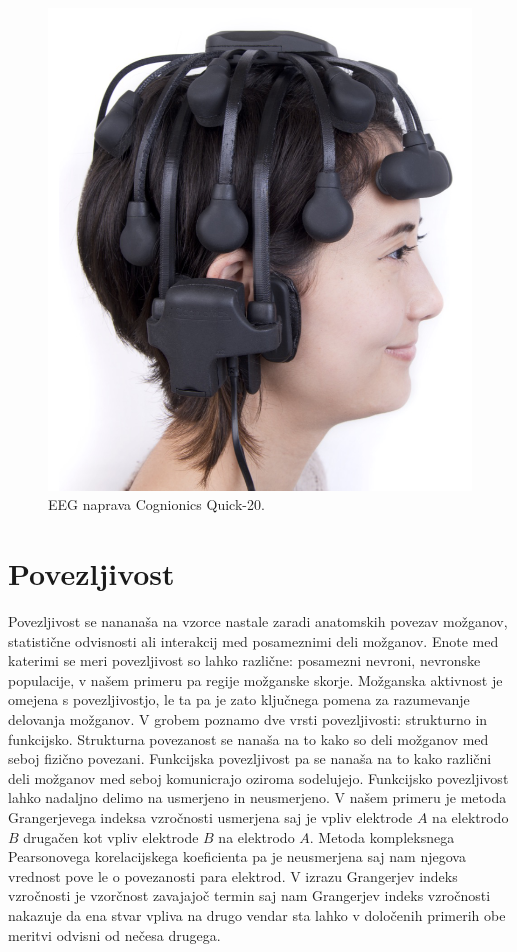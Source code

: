 \begin{figure}[h!]
    \begin{center}
    \includegraphics[width=0.5\linewidth]{slike/Cognionics Quick-20.png}
    \end{center}
    \caption{EEG naprava Cognionics Quick-20. \cite{CognionicsQUICK20User}}
    \label{slika:quick_20}
    \end{figure}
\section{Povezljivost}
Povezljivost se nananaša na vzorce nastale zaradi anatomskih povezav možganov, statistične odvisnosti ali interakcij med posameznimi deli možganov.  Enote med katerimi se meri povezljivost so lahko različne: posamezni nevroni, nevronske populacije, v našem primeru pa regije možganske skorje. Možganska aktivnost je omejena s povezljivostjo, le ta pa je zato ključnega pomena za razumevanje delovanja možganov. V grobem poznamo dve vrsti povezljivosti: strukturno in funkcijsko. Strukturna povezanost se nanaša na to kako so deli možganov med seboj fizično povezani. Funkcijska povezljivost pa se nanaša na to kako različni deli možganov med seboj komunicrajo oziroma sodelujejo.\cite{spornsBrainConnectivity2007} Funkcijsko povezljivost lahko nadaljno delimo na usmerjeno in neusmerjeno. V našem primeru je metoda Grangerjevega indeksa vzročnosti usmerjena saj je vpliv elektrode $A$ na elektrodo $B$ drugačen kot vpliv elektrode $B$ na elektrodo $A$. Metoda kompleksnega Pearsonovega korelacijskega koeficienta pa je neusmerjena saj nam njegova vrednost pove le o povezanosti para elektrod.
V izrazu Grangerjev indeks vzročnosti je vzorčnost zavajajoč termin saj nam Grangerjev indeks vzročnosti nakazuje da ena stvar vpliva na drugo vendar sta lahko v določenih primerih obe meritvi odvisni od nečesa drugega. 
